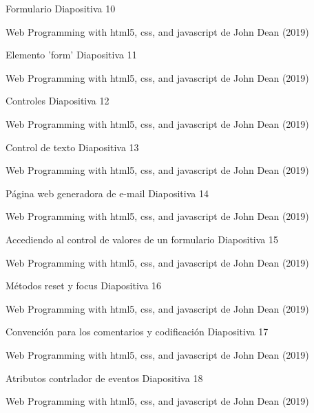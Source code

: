 \begin{frame}{Formulario}
\justifying
Diapositiva 10


{\tiny Web Programming with html5, css, and javascript de John Dean (2019)}
\end{frame}

\begin{frame}{Elemento 'form'}
\justifying
Diapositiva 11


{\tiny Web Programming with html5, css, and javascript de John Dean (2019)}
\end{frame}

\begin{frame}{Controles}
\justifying
Diapositiva 12


{\tiny Web Programming with html5, css, and javascript de John Dean (2019)}
\end{frame}

\begin{frame}{Control de texto}
\justifying
Diapositiva 13


{\tiny Web Programming with html5, css, and javascript de John Dean (2019)}
\end{frame}

\begin{frame}{Página web generadora de e-mail}
\justifying
Diapositiva 14


{\tiny Web Programming with html5, css, and javascript de John Dean (2019)}
\end{frame}

\begin{frame}{Accediendo al control de valores de un formulario}
\justifying
Diapositiva 15


{\tiny Web Programming with html5, css, and javascript de John Dean (2019)}
\end{frame}

\begin{frame}{Métodos reset y focus}
\justifying
Diapositiva 16


{\tiny Web Programming with html5, css, and javascript de John Dean (2019)}
\end{frame}

\begin{frame}{Convención para los comentarios y codificación}
\justifying
Diapositiva 17


{\tiny Web Programming with html5, css, and javascript de John Dean (2019)}
\end{frame}

\begin{frame}{Atributos contrlador de eventos}
\justifying
Diapositiva 18


{\tiny Web Programming with html5, css, and javascript de John Dean (2019)}
\end{frame}

